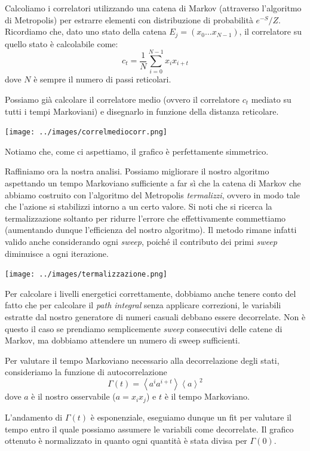 \documentclass[a4paper,10pt]{article}
\begin{document}
Calcoliamo i correlatori utilizzando una catena di Markov (attraverso l'algoritmo di Metropolis) per estrarre elementi con distribuzione di probabilità $e^{-S}/Z$. Ricordiamo che, dato uno stato della catena $E_j=(x_0\dots x_{N-1})$, il correlatore su quello stato è calcolabile come:
$$c_t=\frac{1}{N}\sum_{i=0}^{N-1}x_ix_{i+t}$$
dove $N$ è sempre il numero di passi reticolari.

Possiamo già calcolare il correlatore medio (ovvero il correlatore $c_t$ mediato su tutti i tempi Markoviani) e disegnarlo in funzione della distanza reticolare.

\begin{center}
 \texttt{[image: ../images/correlmediocorr.png]}
\end{center}

Notiamo che, come ci aspettiamo, il grafico è perfettamente simmetrico.

Raffiniamo ora la nostra analisi. Possiamo migliorare il nostro algoritmo aspettando un tempo Markoviano sufficiente a far sì che la catena di Markov che abbiamo costruito con l'algoritmo del Metropolis \emph{termalizzi}, ovvero in modo tale che l'azione si stabilizzi intorno a un certo valore. Si noti che si ricerca la termalizzazione soltanto per ridurre l'errore che effettivamente commettiamo (aumentando dunque l'efficienza del nostro algoritmo). Il metodo rimane infatti valido anche considerando ogni \emph{sweep}, poiché il contributo dei primi \emph{sweep} diminuisce a ogni iterazione.
\begin{center}
 \texttt{[image: ../images/termalizzazione.png]}
\end{center}

Per calcolare i livelli energetici correttamente, dobbiamo anche tenere conto del fatto che per calcolare il \emph{path integral} senza applicare correzioni, le variabili estratte dal nostro generatore di numeri casuali debbano essere decorrelate. Non è questo il caso se prendiamo semplicemente \emph{sweep} consecutivi delle catene di Markov, ma dobbiamo attendere un numero di sweep sufficienti.

Per valutare il tempo Markoviano necessario alla decorrelazione degli stati, consideriamo la funzione di autocorrelazione
$$\Gamma(t) = \left<a^ia^{i+t}\right>\left<a\right>^2$$
dove $a$ è il nostro osservabile ($a=x_ix_j$) e $t$ è il tempo Markoviano.

L'andamento di $\Gamma(t)$ è esponenziale, eseguiamo dunque un fit per valutare il tempo entro il quale possiamo assumere le variabili come decorrelate. Il grafico ottenuto è normalizzato in quanto ogni quantità è stata divisa per $\Gamma(0)$.
\end{document}
